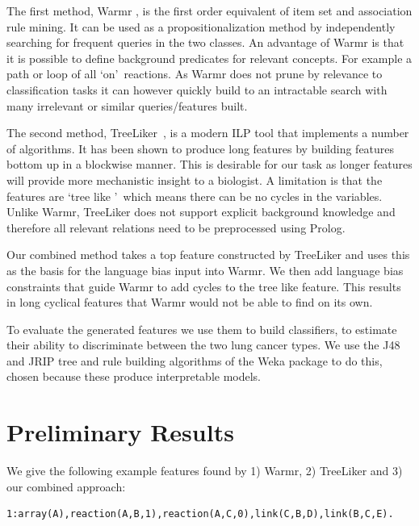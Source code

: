 \documentclass[runningheads,a4paper]{llncs}
\begin{document}
The first method, Warmr \citep{dehaspe_mining_1997}, is the first order equivalent of item set and association rule mining. It can be used as a propositionalization method by independently searching for frequent queries in the two classes. An advantage of Warmr is that it is possible to define background predicates for relevant concepts. For example a path or loop of all \lq on\rq\ reactions. As Warmr does not prune by relevance to classification tasks it can however quickly build to an intractable search with many irrelevant or similar queries/features built. 

The second method, TreeLiker~\citep{vzelezny2013fast}, is a modern ILP tool that implements a number of algorithms. It has been shown to produce long features by building features bottom up in a blockwise manner. This is desirable for our task as longer features will provide more mechanistic insight to a biologist. A limitation is that the features are \lq tree like \rq\ which means there can be no cycles in the variables. Unlike Warmr, TreeLiker does not support explicit background knowledge and therefore all relevant relations need to be preprocessed using Prolog.

Our combined method takes a top feature constructed by TreeLiker and uses this as the basis for the language bias input into Warmr. 
We then add language bias constraints that guide Warmr to add cycles to the tree like feature.
This results in long cyclical features that Warmr would not be able to find on its own. 
	     
To evaluate the generated features we use them to build classifiers, to estimate their ability to discriminate between the two lung cancer types.
We use the J48 and JRIP tree and rule building algorithms of the Weka package to do this, chosen because these produce interpretable models.

\section{Preliminary Results}

We give the following example features found by 1) Warmr, 2) TreeLiker and 3) our combined approach:
\begin{verbatim}
1:array(A),reaction(A,B,1),reaction(A,C,0),link(C,B,D),link(B,C,E).
\end{verbatim}
\end{document}
